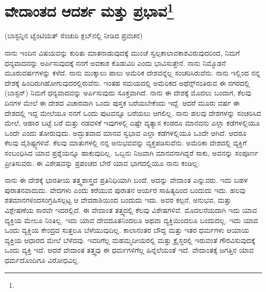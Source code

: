 
\chapter[ವೇದಾಂತದ ಆದರ್ಶ ಮತ್ತು ಪ್ರಭಾವ]{ವೇದಾಂತದ ಆದರ್ಶ ಮತ್ತು ಪ್ರಭಾವ\protect\footnote{}}

\begin{center}
(ಬಾಸ್ಟನ್ನಿನ ಟ್ವೆಂಟಿಯತ್ ಸೆಂಚುರಿ ಕ್ಲಬ್‌ನಲ್ಲಿ ನೀಡಿದ ಪ್ರವಚನ)
\end{center}

ನಾನು ಇಂದಿನ ವಿಷಯವನ್ನು ಕುರಿತು ಮಾತನಾಡುವುದಕ್ಕೆ ಮುಂಚೆ ಸ್ವಲ್ಪ\break ಕಾಲಾವಕಾಶವಿರುವುದರಿಂದ, ನಿಮಗೆ ಧನ್ಯವಾದವನ್ನು ಅರ್ಪಿಸುವುದಕ್ಕೆ ನನಗೆ ಅವಕಾಶ ಕೊಡುವಿರಿ ಎಂದು ಭಾವಿಸುತ್ತೇನೆ. ನಾನು ನಿಮ್ಮೊಡನೆ ಮೂರುವರ್ಷಗಳನ್ನು ಕಳೆದೆ. ನಾನು ಮುಕ್ಕಾಲು ಪಾಲು ಅಮೆರಿಕ ದೇಶವನ್ನೆಲ್ಲ ಸಂಚರಿಸಿರುವೆನು. ನಾನು ಇಲ್ಲಿಂದ ನನ್ನ ದೇಶಕ್ಕೆ ಹಿಂದಿರುಗಿಹೋಗುವುದರಲ್ಲಿರುವೆನು. ಇಂತಹ ಸಮಯದಲ್ಲಿ ಅಮೆರಿಕದ ಅಥೆನ್ಸ್‌ನಂತಿರುವ ಈ ನಗರದಲ್ಲಿ (ಬಾಸ್ಟನ್) ನಿಮಗೆ ಧನ್ಯವಾದವನ್ನು ಅರ್ಪಿಸುವುದು ಸೂಕ್ತವಾಗಿದೆ. ನಾನು ಈ ದೇಶಕ್ಕೆ ಮೊದಲು ಬಂದಾಗ, ಕೆಲವು ದಿನಗಳ ಮೇಲೆ ಈ ದೇಶದ ವಿಚಾರವಾಗಿ ಒಂದು ಪುಸ್ತಕ ಬರೆಯಬೇಕೆಂದು ಇದ್ದೆ. ಆದರೆ ಮೂರು ವರ್ಷ ಈ ದೇಶದಲ್ಲಿ ಇದ್ದ ಮೇಲೆಯೂ ನನಗೆ ಒಂದು ಪುಟವನ್ನೂ ಬರೆಯಲು ಆಗಲಿಲ್ಲ. ನಾನು ಹಲವು ದೇಶಗಳನ್ನು ಸಂಚರಿಸಿದ ಮೇಲೆ, ಆಹಾರ ಬಟ್ಟೆ ಬರೆ ಮತ್ತು ನಡವಳಿಕೆ ಇವುಗಳಲ್ಲಿ ಎಷ್ಟೇ ವ್ಯತ್ಯಾಸ ಕಂಡರೂ ಮಾನವನು ಎಲ್ಲಾ ಕಡೆಗಳಲ್ಲಿಯೂ ಒಂದೇ ಎಂದು ತೋರುವುದು. ಅದ್ಭುತವಾದ ಮಾನವ ಸ್ವಭಾವ ಎಲ್ಲಾ ಕಡೆಗಳಲ್ಲಿಯೂ ಒಂದೇ ಆಗಿದೆ. ಆದರೂ ಕೆಲವು ವೈಶಿಷ್ಟ್ಯಗಳಿವೆ. ಕೆಲವು ಮಾತುಗಳಲ್ಲಿ ನನ್ನ ಅನುಭವವನ್ನು ವ್ಯಕ್ತಪಡಿಸುವೆನು. ಅಮೆರಿಕಾ ದೇಶದಲ್ಲಿ ವ್ಯಕ್ತಿಗೆ ಸಂಬಂಧಿಸಿದ ಯಾವ ಪ್ರಶ್ನೆಯನ್ನೂ ಹಾಕುವುದಿಲ್ಲ. ಒಬ್ಬನು ನಿಜವಾಗಿ ಮಾನವನಾಗಿದ್ದರೆ ಸಾಕು, ಅವನನ್ನು ಸಂಪೂರ್ಣ ಪ್ರೀತಿಸುವರು. ಈ ವಿಶೇಷವನ್ನು ಪ್ರಪಂಚದ ಬೇರೆ ಯಾವ ಭಾಗದಲ್ಲಿಯೂ ನಾನು ಕಂಡಿಲ್ಲ.

\vskip 3pt

ನಾನು ಈ ದೇಶಕ್ಕೆ ಭಾರತೀಯ ತತ್ತ್ವಶಾಸ್ತ್ರದ ಪ್ರತಿನಿಧಿಯಾಗಿ ಬಂದೆ. ಅದನ್ನು ವೇದಾಂತ ಎನ್ನುವರು. ಇದು ಬಹಳ ಪುರಾತನವಾದುದು. ವೇದಗಳು ಎಂದು ಕರೆಯುವ ಪುರಾತನ ಆರ್ಯರ ಸಾಹಿತ್ಯದಿಂದ ಬಂದುದು ಇದು. ಹಲವು ಶತಮಾನಗಳಿಂದ\break ಸಂಗ್ರಹಿಸಲ್ಪಟ್ಟ ಆ ವೇದರಾಶಿಯಿಂದ ಬಂದುದು ಇದು. ಅವರ ಕಲ್ಪನೆ, ಅನುಭವ, ಮತ್ತು ವಿಶ್ಲೇಷಣೆಯ ಸಾರವೇ ಇದರಲ್ಲಿದೆ. ಈ ವೇದಾಂತ ತತ್ತ್ವದಲ್ಲಿ ಕೆಲವು ವಿಶೇಷಗಳಿವೆ. ಮೊದಲನೆಯದಾಗಿ ಇದು ಯಾವ ವ್ಯಕ್ತಿಯ ಮೇಲೂ ನಿಂತಿಲ್ಲ. ಇದು ಯಾವ ದೇವದೂತನಿಂದಲೂ ಅಥವಾ ವ್ಯಕ್ತಿಯಿಂದಲೂ ಬಂದುದಲ್ಲ. ಇದು ಯಾವ ಒಂದು ವ್ಯಕ್ತಿಯ ಕೇಂದ್ರದ ಸುತ್ತಲೂ ಬೆಳೆಯುವುದಿಲ್ಲ. ಕಾಲಾನಂತರ ಬೌದ್ದ ಮತ್ತು ಇತರ ಧರ್ಮಗಳು ಆಯಾಯ ವ್ಯಕ್ತಿಯ ಆಧಾರದ ಮೇಲೆ ಬೆಳೆದವು. ಇವರಿಗೆಲ್ಲ ಮಹಮ್ಮದೀಯರಲ್ಲಿ ಮತ್ತು ಕ್ರೈಸ್ತರಲ್ಲಿ ಇರುವಂತೆ ಗೌರವಿಸುವುದಕ್ಕೆ ಒಂದು ವ್ಯಕ್ತಿ ಇದೆ. ಆದರೆ ವೇದಾಂತ ತತ್ತ್ವವು ಈ ಧರ್ಮಗಳಿಗೆಲ್ಲ ಹಿನ್ನೆಲೆಯಂತೆ ಇದೆ. ವೇದಾಂತಕ್ಕೆ ಜಗತ್ತಿನ ಯಾವ ಧರ್ಮದೊಂದಿಗೂ ವಿರೋಧವಿಲ್ಲ.

\vskip 3pt

